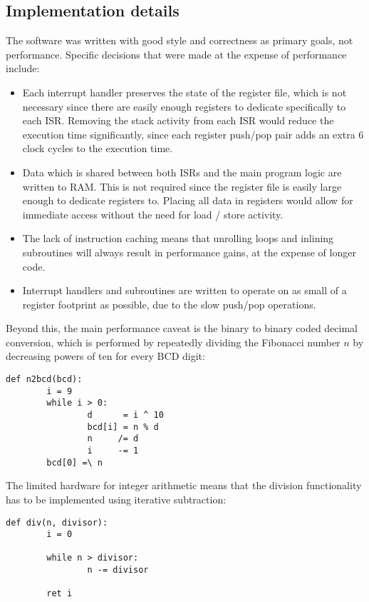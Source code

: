 \documentclass[12pt,a4paper]{article}
\begin{document}
\subsection{Implementation details}

The software was written with good style and correctness as primary
goals, not performance. Specific decisions that were made at the
expense of performance include:

\begin{itemize}
\item Each interrupt handler preserves the state of the register file,
  which is not necessary since there are easily enough registers to
  dedicate specifically to each ISR. Removing the stack activity from
  each ISR would reduce the execution time significantly, since each
  register push/pop pair adds an extra 6 clock cycles to the execution
  time.
\item Data which is shared between both ISRs and the main program
  logic are written to RAM. This is not required since the register
  file is easily large enough to dedicate registers to. Placing all
  data in registers would allow for immediate access without the need
  for load / store activity.
\item The lack of instruction caching means that unrolling loops and
  inlining subroutines will always result in performance gains, at the
  expense of longer code.
\item Interrupt handlers and subroutines are written to operate on as
  small of a register footprint as possible, due to the slow push/pop
  operations.
\end{itemize}

Beyond this, the main performance caveat is the binary to binary coded
decimal conversion, which is performed by repeatedly dividing the
Fibonacci number $n$ by decreasing powers of ten for every BCD digit:

\begin{verbatim}
def n2bcd(bcd):
        i = 9
        while i > 0:
                d      = i ^ 10
                bcd[i] = n % d
                n     /= d
                i     -= 1
        bcd[0] =\ n
\end{verbatim}

The limited hardware for integer arithmetic means that the division
functionality has to be implemented using iterative subtraction:

\begin{verbatim}
def div(n, divisor):
        i = 0

        while n > divisor:
                n -= divisor

        ret i
\end{verbatim}
\end{document}
